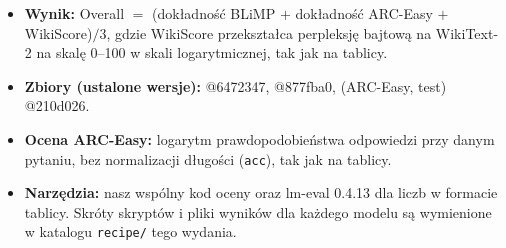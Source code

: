 \begin{itemize}
  \item \textbf{Wynik:} Overall $=$ (dokładność BLiMP $+$ dokładność ARC-Easy $+$ WikiScore)$/3$, gdzie WikiScore
  przekształca perpleksję bajtową na WikiText-2 na skalę 0--100 w skali logarytmicznej, tak jak na tablicy.
  \item \textbf{Zbiory (ustalone wersje):}  @6472347,
   @877fba0,  (ARC-Easy, test) @210d026.
  \item \textbf{Ocena ARC-Easy:} logarytm prawdopodobieństwa odpowiedzi przy danym pytaniu, bez normalizacji długości
  (\texttt{acc}), tak jak na tablicy.
  \item \textbf{Narzędzia:} nasz wspólny kod oceny oraz lm-eval 0.4.13 dla liczb w formacie tablicy. Skróty skryptów
  i pliki wyników dla każdego modelu są wymienione w katalogu \texttt{recipe/} tego wydania.
\end{itemize}
